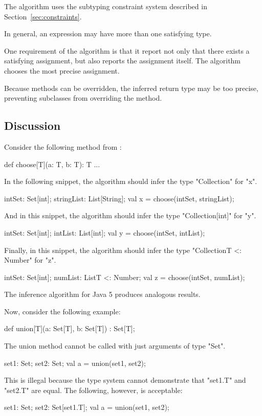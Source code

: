 \documentclass[preprint,nocopyrightspace,9pt]{sigplanconf}
\begin{document}
The algorithm uses the subtyping constraint system described in
Section~\ref{sec:constraints}.

In general, an expression may have more than one satisfying type.

One requirement of the algorithm
is that it report not only that there exists a satisfying
assignment, but also reports the assignment itself.
The algorithm chooses the most precise assignment.

Because methods can be overridden, the inferred return type may be too
precise, preventing subclasses from overriding the method.


\subsection{Discussion}

Consider the following method from \cite{adding-wildcards}:
\begin{xten}
def choose[T](a: T, b: T): T { ... }
\end{xten}
%
In the following snippet, the algorithm should infer the type
\xcd"Collection" for \xcd"x".
\begin{xten}
intSet: Set[int];
stringList: List[String];
val x = choose(intSet, stringList);
\end{xten}
%
And in this snippet, the algorithm should infer the type
\xcd"Collection[int]" for \xcd"y".
\begin{xten}
intSet: Set[int];
intList: List[int];
val y = choose(intSet, intList);
\end{xten}
%
Finally, in this snippet, the algorithm should infer the type
\xcd"Collection{T <: Number}" for \xcd"z".
\begin{xten}
intSet: Set[int];
numList: List{T <: Number};
val z = choose(intSet, numList);
\end{xten}
The inference algorithm for Java 5 produces analogous results.

Now, consider the following example:
\begin{xten}
def union[T](a: Set[T], b: Set[T]) : Set[T];
\end{xten}
The union method cannot be called with just arguments of type \xcd"Set".
\begin{xten}
set1: Set;
set2: Set;
val a = union(set1, set2);
\end{xten}
This is illegal because the type system cannot demonstrate that
\xcd"set1.T" and \xcd"set2.T" are equal.
The following, however, is acceptable:
\begin{xten}
set1: Set;
set2: Set[set1.T];
val a = union(set1, set2);
\end{xten}
\end{document}

